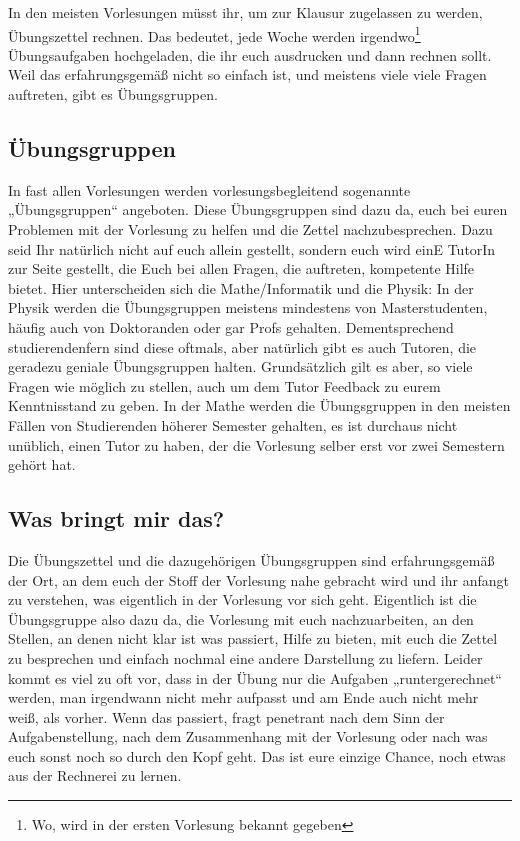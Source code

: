 \newpage{}

\noindent In den meisten Vorlesungen müsst ihr, um zur Klausur zugelassen zu werden, Übungszettel rechnen. Das bedeutet, jede Woche werden irgendwo\footnote{Wo, wird in der ersten Vorlesung bekannt gegeben} Übungsaufgaben hochgeladen, die ihr euch ausdrucken und dann rechnen sollt. Weil das erfahrungsgemäß nicht so einfach ist, und meistens viele viele Fragen auftreten, gibt es Übungsgruppen.

\subsection{Übungsgruppen}
In fast allen Vorlesungen werden vorlesungsbegleitend sogenannte „Übungsgruppen“ angeboten. Diese Übungsgruppen sind dazu da, euch bei euren Problemen mit der Vorlesung zu helfen und die Zettel nachzubesprechen. Dazu seid Ihr natürlich nicht auf euch allein gestellt, sondern euch wird einE TutorIn zur Seite gestellt, die Euch bei allen Fragen, die auftreten, kompetente Hilfe bietet. Hier unterscheiden sich die Mathe/Informatik und die Physik: In der Physik werden die Übungsgruppen meistens mindestens von Masterstudenten, häufig auch von Doktoranden oder gar Profs gehalten. Dementsprechend studierendenfern sind diese oftmals, aber natürlich gibt es auch Tutoren, die geradezu geniale Übungsgruppen halten. Grundsätzlich gilt es aber, so viele Fragen wie möglich zu stellen, auch um dem Tutor Feedback zu eurem Kenntnisstand zu geben. In der Mathe werden die Übungsgruppen in den meisten Fällen von Studierenden höherer Semester gehalten, es ist durchaus nicht unüblich, einen Tutor zu haben, der die Vorlesung selber erst vor zwei Semestern gehört hat.

\subsection{Was bringt mir das?}
Die Übungszettel und die dazugehörigen Übungsgruppen sind erfahrungsgemäß der Ort, an dem euch der Stoff der Vorlesung nahe gebracht wird und ihr anfangt zu verstehen, was eigentlich in der Vorlesung vor sich geht. Eigentlich ist die Übungsgruppe also dazu da, die Vorlesung mit euch nachzuarbeiten, an den Stellen, an denen nicht klar ist was passiert, Hilfe zu bieten, mit euch die Zettel zu besprechen und einfach nochmal eine andere Darstellung zu liefern. Leider kommt es viel zu oft vor, dass in der Übung nur die Aufgaben „runtergerechnet“ werden, man irgendwann nicht mehr aufpasst und am Ende auch nicht mehr weiß, als vorher. Wenn das passiert, fragt penetrant nach dem Sinn der Aufgabenstellung, nach dem Zusammenhang mit der Vorlesung oder nach was euch sonst noch so durch den Kopf geht. Das ist eure einzige Chance, noch etwas aus der Rechnerei zu lernen.


